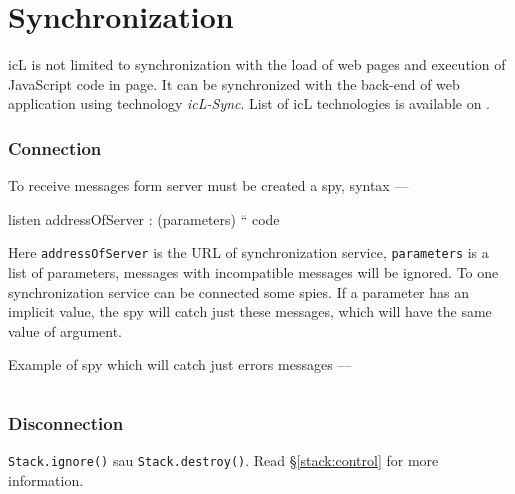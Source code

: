 \section{Synchronization}
\label{sync}

icL is not limited to synchronization with the load of web pages and execution of JavaScript code in page. It can be synchronized with the back-end of web application using technology \textit{icL-Sync}. List of icL technologies is available on .

\subsubsection{Connection}

To receive messages form server must be created a spy, syntax —
\begin{iclcode}
listen addressOfServer : (parameters) {
	`` code
}
\end{iclcode}

Here \texttt{addressOfServer} is the URL of synchronization service, \texttt{parameters} is a list of parameters, messages with incompatible messages will be ignored. To one synchronization service can be connected some spies. If a parameter has an implicit value, the spy will catch just these messages, which will have the same value of argument. 

Example of spy which will catch just errors messages —
\inputminted[linenos]{icl}{../sources/errorcatch.icL}

\subsubsection{Disconnection} \texttt{Stack.ignore()} sau \texttt{Stack.destroy()}. Read §\ref{stack:control} for more information.

